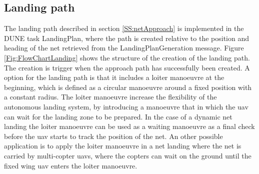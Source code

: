 \subsection{Landing path}
The landing path described in section \ref{SS:netApproach} is implemented in the DUNE task LandingPlan, where the path is created relative to the position and heading of the net retrieved from the LandingPlanGeneration message. Figure \ref{Fig:FlowChartLanding} shows the structure of the creation of the landing path. The creation is trigger when the approach path has successfully been created. A option for the landing path is that it includes a loiter manoeuvre at the beginning, which is defined as a circular manoeuvre around a fixed position with a constant radius. The loiter manoeuvre increase the flexibility of the autonomous landing system, by introducing a manoeuvre that in which the \gls{uav} can wait for the landing zone to be prepared. In the case of a dynamic net landing the loiter manoeuvre can be used as a waiting manoeuvre as a final check before the \gls{uav} starts to track the position of the net. An other possible application is to apply the loiter manoeuvre in a net landing where the net is carried by multi-copter \glspl{uav}, where the copters can wait on the ground until the fixed wing \gls{uav} enters the loiter manoeuvre.
